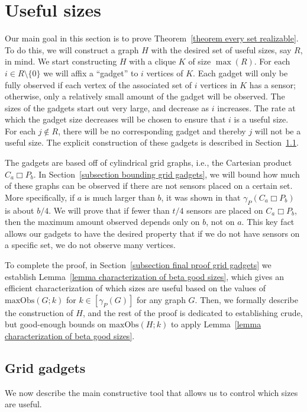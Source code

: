 \documentclass{article}
\begin{document}
\section{Useful sizes}\label{section useful sizes}
    Our main goal in this section is to prove Theorem~\ref{theorem every set realizable}.
    To do this, we will construct a graph $H$ with the desired set of useful sizes, say $R$, in mind.
    We start constructing $H$ with a clique $K$ of size $\max(R)$.
    For each $i\in R\setminus \{0\}$ we will affix a ``gadget'' to $i$ vertices of $K$.
    Each gadget will only be fully observed if each vertex of the associated set of $i$ vertices in $K$ has a sensor; otherwise, only a relatively small amount of the gadget will be observed.
    The sizes of the gadgets start out very large, and decrease as $i$ increases.
    The rate at which the gadget size decreases will be chosen to ensure that $i$ is a useful size.
    For each $j\not\in R$, there will be no corresponding gadget and thereby $j$ will not be a useful size.
    The explicit construction of these gadgets is described in Section~\ref{subsection grid gadget}.

    The gadgets are based off of cylindrical grid graphs, i.e., the Cartesian product $C_a\Box P_b$. 
    In Section~\ref{subsection bounding grid gadgets}, we will bound how much of these graphs can be observed if there are not sensors placed on a certain set.
    More specifically, if $a$ is much larger than $b$, it was shown in \cite{DH2006} that $\gamma_P(C_a\Box P_b)$ is about $b/4$.
    We will prove that if fewer than $t/4$ sensors are placed on $C_a\Box P_b$, then  the maximum amount observed depends only on $b$, not on $a$.
    This key fact allows our gadgets to have the desired property that if we do not have sensors on a specific set, we do not observe many vertices.
    
    To complete the proof, in Section~\ref{subsection final proof grid gadgets} we establish Lemma~\ref{lemma characterization of beta good sizes}, which gives an efficient characterization of which sizes are useful based on the values of $\mathrm{maxObs}(G;k)$ for $k\in [\gamma_P(G)]$ for any graph $G$.
    Then, we formally describe the construction of $H$, and the rest of the proof is dedicated to establishing crude, but good-enough bounds on $\mathrm{maxObs}(H;k)$ to apply Lemma~\ref{lemma characterization of beta good sizes}.
    
    \subsection{Grid gadgets}\label{subsection grid gadget}
        We now describe the main constructive tool that allows us to control which sizes are useful.
        
\end{document}
